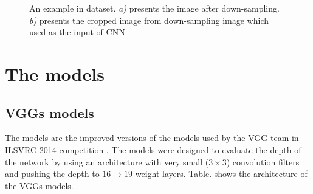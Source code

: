 \documentclass[12pt,a4paper]{article}
\begin{document}
\begin{figure}[h!]
\centering
{}\hspace{1cm}
\caption{An example in dataset. \textit{a)} presents the image after down-sampling. \textit{b)} presents the cropped image from down-sampling image which used as the input of CNN}
\label{figdata}
\end{figure}
\section{The models}
\subsection{VGGs models}
The models are the improved versions of the models used by the VGG team in ILSVRC-2014 competition \cite{simonyan2014very}. The models were designed to evaluate the depth of the network by using an architecture with very small ($3 \times 3$) convolution filters and pushing the depth to $16 \to 19$ weight layers. Table. shows the architecture of the VGGs models.
\end{document}
